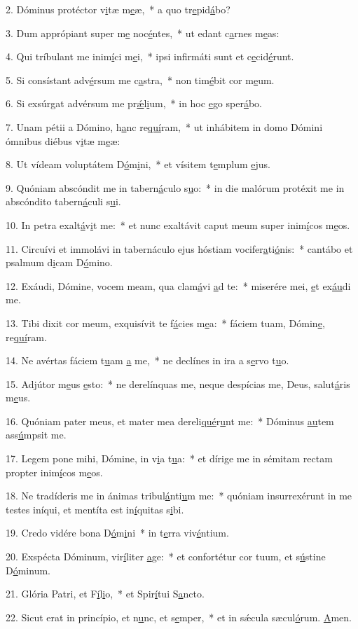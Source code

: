 2. Dóminus protéctor v\uline{i}tæ m\uline{e}æ,~* a quo tr\uline{e}pid\uline{á}bo?\par 
3. Dum apprópiant super m\uline{e} noc\uline{é}ntes,~* ut edant c\uline{a}rnes m\uline{e}as:\par 
4. Qui tríbulant me inim\uline{í}ci m\uline{e}i,~* ipsi infirmáti sunt et c\uline{e}cid\uline{é}runt.\par 
5. Si consístant adv\uline{é}rsum me c\uline{a}stra,~* non tim\uline{é}bit cor m\uline{e}um.\par 
6. Si exsúrgat advérsum me pr\uline{ǽ}l\uline{i}um,~* in hoc \uline{e}go sper\uline{á}bo.\par 
7. Unam pétii a Dómino, h\uline{a}nc re\uline{quí}ram,~* ut inhábitem in domo Dómini ómnibus diébus v\uline{i}tæ m\uline{e}æ:\par 
8. Ut vídeam voluptátem D\uline{ó}m\uline{i}ni,~* et vísitem t\uline{e}mplum \uline{e}jus.\par 
9. Quóniam abscóndit me in tabern\uline{á}culo s\uline{u}o:~* in die malórum protéxit me in abscóndito tabern\uline{á}culi s\uline{u}i.\par 
10. In petra exalt\uline{á}v\uline{i}t me:~* et nunc exaltávit caput meum super inim\uline{í}cos m\uline{e}os.\par 
11. Circuívi et immolávi in tabernáculo ejus hóstiam vocifer\uline{a}ti\uline{ó}nis:~* cantábo et psalmum d\uline{i}cam D\uline{ó}mino.\par 
12. Exáudi, Dómine, vocem meam, qua clam\uline{á}vi \uline{a}d te:~* miserére mei, \uline{e}t ex\uline{áu}di me.\par 
13. Tibi dixit cor meum, exquisívit te f\uline{á}cies m\uline{e}a:~* fáciem tuam, Dómin\uline{e}, re\uline{quí}ram.\par 
14. Ne avértas fáciem t\uline{u}am \uline{a} me,~* ne declínes in ira a s\uline{e}rvo t\uline{u}o.\par 
15. Adjútor m\uline{e}us \uline{e}sto:~* ne derelínquas me, neque despícias me, Deus, salut\uline{á}ris m\uline{e}us.\par 
16. Quóniam pater meus, et mater mea dereli\uline{qué}r\uline{u}nt me:~* Dóminus \uline{au}tem ass\uline{ú}mpsit me.\par 
17. Legem pone mihi, Dómine, in v\uline{i}a t\uline{u}a:~* et dírige me in sémitam rectam propter inim\uline{í}cos m\uline{e}os.\par 
18. Ne tradíderis me in ánimas tribul\uline{á}nti\uline{u}m me:~* quóniam insurrexérunt in me testes iníqui, et mentíta est in\uline{í}quitas s\uline{i}bi.\par 
19. Credo vidére bona D\uline{ó}m\uline{i}ni~* in t\uline{e}rra viv\uline{é}ntium.\par 
20. Exspécta Dóminum, vir\uline{í}liter \uline{a}ge:~* et confortétur cor tuum, et s\uline{ú}stine D\uline{ó}minum.\par 
21. Glória Patri, et F\uline{í}l\uline{i}o,~* et Spir\uline{í}tui S\uline{a}ncto.\par 
22. Sicut erat in princípio, et n\uline{u}nc, et s\uline{e}mper,~* et in sǽcula sæcul\uline{ó}rum. \uline{A}men.\par 
